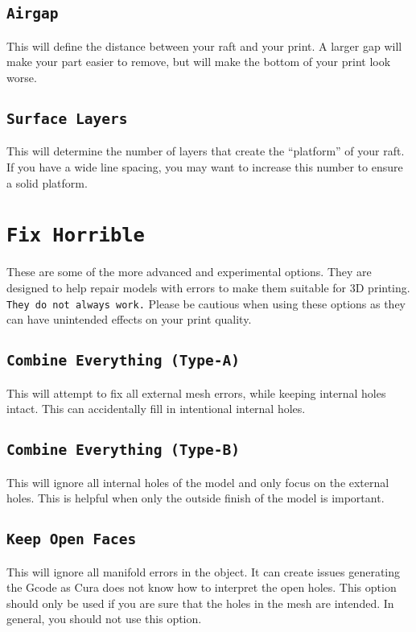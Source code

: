 \subsection{\texttt{Airgap}}
This will define the distance between your raft and your print. A larger gap will make your part easier to remove, but will make the bottom of your print look worse.

\subsection{\texttt{Surface Layers}}
This will determine the number of layers that create the “platform” of your raft. If you have a wide line spacing, you may want to increase this number to ensure a solid platform. 

\section{\texttt{Fix Horrible}}
These are some of the more advanced and experimental options. They are designed to help repair models with errors to make them suitable for 3D printing. \texttt{They do not always work.} Please be cautious when using these options as they can have unintended effects on your print quality.

\subsection{\texttt{Combine Everything (Type-A)}}
This will attempt to fix all external mesh errors, while keeping internal holes intact. This can accidentally fill in intentional internal holes.

\subsection{\texttt{Combine Everything (Type-B)}}
This will ignore all internal holes of the model and only focus on the external holes. This is helpful when only the outside finish of the model is important.

\subsection{\texttt{Keep Open Faces}}
This will ignore all manifold errors in the object. It can create issues generating the Gcode as Cura does not know how to interpret the open holes. This option should only be used if you are sure that the holes in the mesh are intended. In general, you should not use this option.

